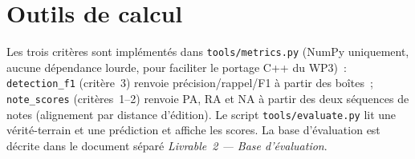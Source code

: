 \documentclass[11pt,a4paper]{article}
\begin{document}
\section{Outils de calcul}
Les trois critères sont implémentés dans \texttt{tools/metrics.py} (NumPy uniquement, aucune dépendance
lourde, pour faciliter le portage C++ du WP3)~: \texttt{detection\_f1} (critère~3) renvoie
précision/rappel/F1 à partir des boîtes~; \texttt{note\_scores} (critères~1--2) renvoie PA, RA et NA à partir
des deux séquences de notes (alignement par distance d'édition). Le script \texttt{tools/evaluate.py} lit une
vérité-terrain et une prédiction et affiche les scores. La base d'évaluation est décrite dans le document
séparé \emph{Livrable~2 --- Base d'évaluation}.

\printbibliography[heading=bibnumbered,title={Références}]
\end{document}
